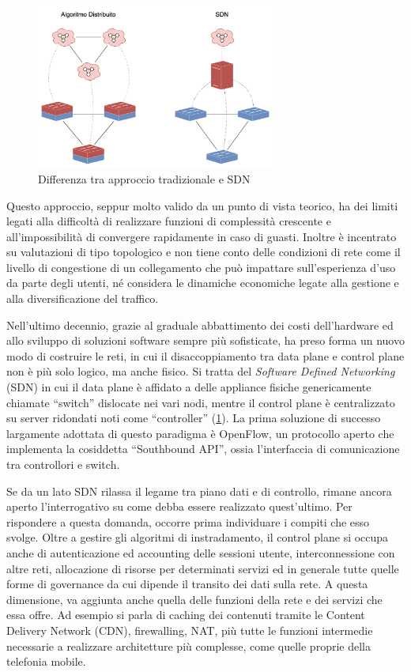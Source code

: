 \begin{figure}[htb]
    \includegraphics[width=0.7\textwidth]{graphics/trad-vs-sdn.png}
    \caption{Differenza tra approccio tradizionale e SDN}
    \label{fig:trad-vs-sdn}
\end{figure}

Questo approccio, seppur molto valido da un punto di vista teorico, ha dei limiti legati alla difficoltà di realizzare funzioni di complessità crescente e all'impossibilità di convergere rapidamente in caso di guasti. Inoltre è incentrato su valutazioni di tipo topologico e non tiene conto delle condizioni di rete come il livello di congestione di un collegamento che può impattare sull'esperienza d'uso da parte degli utenti, né considera le dinamiche economiche legate alla gestione e alla diversificazione del traffico.

Nell'ultimo decennio, grazie al graduale abbattimento dei costi dell'hardware ed allo sviluppo di soluzioni software sempre più sofisticate, ha preso forma un nuovo modo di costruire le reti, in cui il disaccoppiamento tra data plane e control plane non è più solo logico, ma anche fisico. Si tratta del \textit{Software Defined Networking} (SDN) in cui il data plane è affidato a delle appliance fisiche genericamente chiamate ``switch'' dislocate nei vari nodi, mentre il control plane è centralizzato su server ridondati noti come ``controller'' (\cref{fig:trad-vs-sdn}). La prima soluzione di successo largamente adottata di questo paradigma è OpenFlow, un protocollo aperto che implementa la cosiddetta ``Southbound API'', ossia l'interfaccia di comunicazione tra controllori e switch.

Se da un lato SDN rilassa il legame tra piano dati e di controllo, rimane ancora aperto l'interrogativo su come debba essere realizzato quest'ultimo. Per rispondere a questa domanda, occorre prima individuare i compiti che esso svolge. Oltre a gestire gli algoritmi di instradamento, il control plane si occupa anche di autenticazione ed accounting delle sessioni utente, interconnessione con altre reti, allocazione di risorse per determinati servizi ed in generale tutte quelle forme di governance da cui dipende il transito dei dati sulla rete. A questa dimensione, va aggiunta anche quella delle funzioni della rete e dei servizi che essa offre. Ad esempio si parla di caching dei contenuti tramite le Content Delivery Network (CDN), firewalling, NAT, più tutte le funzioni intermedie necessarie a realizzare architetture più complesse, come quelle proprie della telefonia mobile.

